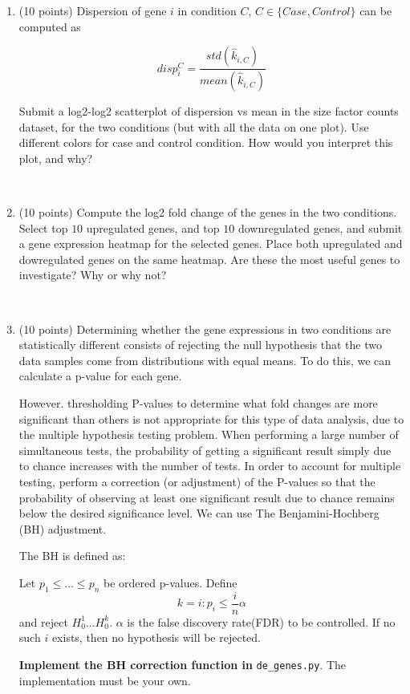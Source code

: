 \begin{enumerate}

\item (10 points) Dispersion of gene $i$ in condition $C$, $C\in \{Case, Control\}$ can be computed as 
 
$$disp_i^{C}=\frac{std(\hat{k}_{i,C})}{mean(\hat{k}_{i,C})}$$ 

Submit a log2-log2 scatterplot of dispersion vs mean in the size factor counts dataset, for the two conditions (but with all the data on one plot). Use different colors for case and control condition. How would you interpret this plot, and why?

\begin{solution}
~
\end{solution}

\item (10 points) Compute the log2 fold change of the genes in the two conditions. Select top $10$ upregulated genes, and top $10$ downregulated genes, and submit a gene expression heatmap for the selected genes. Place both upregulated and dowregulated genes on the same heatmap. Are these the most useful genes to investigate? Why or why not?

\begin{solution}
~
\end{solution}

\item (10 points) Determining whether the gene expressions in two conditions are statistically different consists of rejecting the null hypothesis that the two data samples come from distributions with equal means. To do this, we can calculate a p-value for each gene.

However. thresholding P-values to determine what fold changes are more significant than others is not appropriate for this type of data analysis, due to the multiple hypothesis testing problem. When performing a large number of simultaneous tests, the probability of getting a significant result simply due to chance increases with the number of tests. In order to account for multiple testing, perform a correction (or adjustment) of the P-values so that the probability of observing at least one significant result due to chance remains below the desired significance level. 
We can use The Benjamini-Hochberg (BH) adjustment.

The BH is defined as:

Let $p_1\leq ... \leq p_n$ be ordered p-values. Define
$$k = i : p_i \leq \frac{i}{n}\alpha$$
and reject $H_0^1...H_0^k$. $\alpha$ is the false discovery rate(FDR) to be controlled. If no such $i$ exists, then no hypothesis will be rejected. 

\textbf{Implement the BH correction function in }\texttt{de\_genes.py}. The implementation must be your own.\\

\end{enumerate}


